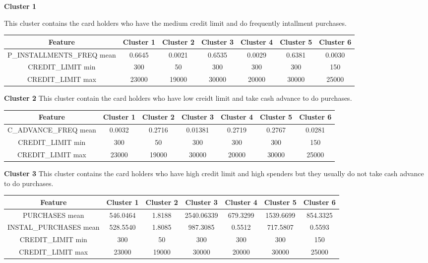 \documentclass{article}
\begin{document}
            \textbf{Cluster 1}

            This cluster contains the card holders who have the medium credit limit and do frequently intallment purchases.

            \begin{tabular}{|c|c|c|c|c|c|c|}
                \hline
                Feature & Cluster 1 & Cluster 2 & Cluster 3 & Cluster 4 & Cluster 5 & Cluster 6 \\
                \hline
                P\_INSTALLMENTS\_FREQ mean & 0.6645 & 0.0021 & 0.6535 & 0.0029	& 0.6381	& 0.0030 \\
                \hline
                CREDIT\_LIMIT min & 300 & 50	& 300 & 300 & 300 & 150 \\
                CREDIT\_LIMIT max & 23000	& 19000	& 30000	& 20000	& 30000	& 25000 \\
                \hline
            \end{tabular}

            \hfill

            \textbf{Cluster 2}
            This cluster contain the card holders who have low creidt limit and take cash advance to do purchases.

            \begin{tabular}{|c|c|c|c|c|c|c|}
                \hline
                Feature & Cluster 1 & Cluster 2 & Cluster 3 & Cluster 4 & Cluster 5 & Cluster 6 \\
                \hline
                C\_ADVANCE\_FREQ mean& 0.0032 &	0.2716 &	0.01381 &	0.2719 &	0.2767 &	0.0281 \\
                \hline
                CREDIT\_LIMIT min & 300 & 50	& 300 & 300 & 300 & 150 \\
                CREDIT\_LIMIT max & 23000	& 19000	& 30000	& 20000	& 30000	& 25000 \\
                \hline
            \end{tabular}

            \hfill

            \textbf{Cluster 3}
            This cluster contains the card holders who have high credit limit and high spenders but they usually do not take cash advance to do purchases.

            \begin{tabular}{|c|c|c|c|c|c|c|}
                \hline
                Feature & Cluster 1 & Cluster 2 & Cluster 3 & Cluster 4 & Cluster 5 & Cluster 6 \\
                \hline
                PURCHASES mean& 546.0464 &	1.8188 &	2540.06339 & 679.3299 &	1539.6699 &	854.3325 \\
                \hline
                INSTAL\_PURCHASES mean & 528.5540 &	1.8085 &	987.3085 &	0.5512 &	717.5807 &	0.5593 \\
                \hline
                CREDIT\_LIMIT min & 300 & 50	& 300 & 300 & 300 & 150 \\
                CREDIT\_LIMIT max & 23000	& 19000	& 30000	& 20000	& 30000	& 25000 \\
                \hline
            \end{tabular}
\end{document}
